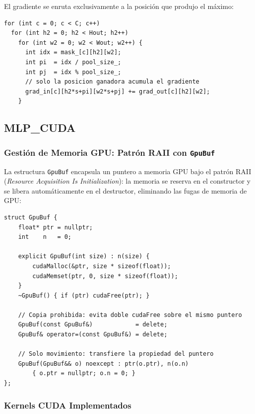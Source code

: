 \documentclass[12pt,a4paper]{article}
\begin{document}
El gradiente se enruta exclusivamente a la posición que produjo el máximo:

\begin{lstlisting}[caption={MAX Pooling backward — solo el ganador recibe gradiente}]
for (int c = 0; c < C; c++)
  for (int h2 = 0; h2 < Hout; h2++)
    for (int w2 = 0; w2 < Wout; w2++) {
      int idx = mask_[c][h2][w2];
      int pi  = idx / pool_size_;
      int pj  = idx % pool_size_;
      // solo la posicion ganadora acumula el gradiente
      grad_in[c][h2*s+pi][w2*s+pj] += grad_out[c][h2][w2];
    }
\end{lstlisting}

\subsection{MLP\_CUDA}

\subsubsection{Gestión de Memoria GPU: Patrón RAII con \texttt{GpuBuf}}

La estructura \texttt{GpuBuf} encapsula un puntero a memoria GPU bajo el patrón RAII
(\textit{Resource Acquisition Is Initialization}): la memoria se reserva en el
constructor y se libera automáticamente en el destructor, eliminando las fugas de
memoria de GPU:

\begin{lstlisting}[caption={GpuBuf: RAII para memoria GPU}]
struct GpuBuf {
    float* ptr = nullptr;
    int    n   = 0;

    explicit GpuBuf(int size) : n(size) {
        cudaMalloc(&ptr, size * sizeof(float));
        cudaMemset(ptr, 0, size * sizeof(float));
    }
    ~GpuBuf() { if (ptr) cudaFree(ptr); }

    // Copia prohibida: evita doble cudaFree sobre el mismo puntero
    GpuBuf(const GpuBuf&)            = delete;
    GpuBuf& operator=(const GpuBuf&) = delete;

    // Solo movimiento: transfiere la propiedad del puntero
    GpuBuf(GpuBuf&& o) noexcept : ptr(o.ptr), n(o.n)
        { o.ptr = nullptr; o.n = 0; }
};
\end{lstlisting}

\subsubsection{Kernels CUDA Implementados}
\end{document}
